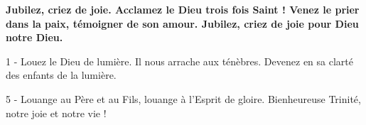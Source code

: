 
\textbf{Jubilez, criez de joie. Acclamez le Dieu trois fois Saint ! Venez le prier dans la paix, témoigner de son amour.
Jubilez, criez de joie pour Dieu notre Dieu.}

1 - Louez le Dieu de lumière. Il nous arrache aux ténèbres.
Devenez en sa clarté des enfants de la lumière.

5 - Louange au Père et au Fils, louange à l'Esprit de gloire.
Bienheureuse Trinité, notre joie et notre vie !
